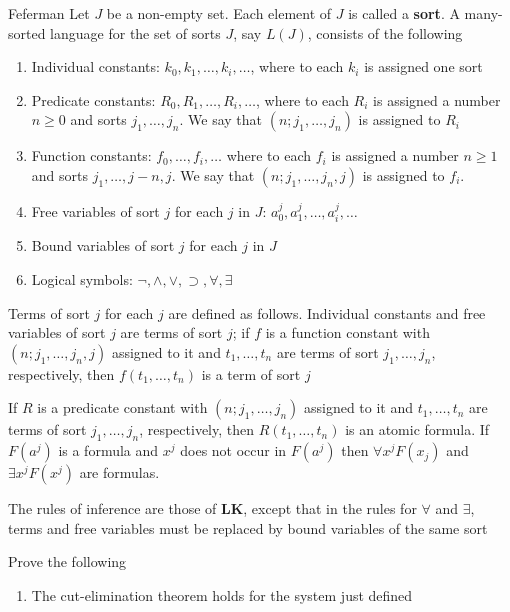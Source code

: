 \documentclass[11pt]{article}
\def \LK {\textbf{LK}}
\begin{document}
\begin{exercise}{Feferman}
\label{ex8.4} 
Let \(J\) be a non-empty set. Each element of \(J\) is called a \textbf{sort}. A many-sorted language for
the set of sorts \(J\), say \(L(J)\), consists of the following
\begin{enumerate}
\item Individual constants: \(k_0,k_1,\dots,k_i,\dots\), where to each \(k_i\) is assigned one sort
\item Predicate constants: \(R_0,R_1,\dots,R_i,\dots\), where to each \(R_i\) is assigned a number
\(n\ge0\) and sorts \(j_1,\dots,j_n\). We say that \((n;j_1,\dots,j_n)\) is assigned to \(R_i\)
\item Function constants: \(f_0,\dots,f_i,\dots\) where to each \(f_i\) is assigned a number
\(n\ge1\) and sorts \(j_1,\dots,j-n,j\). We say that \((n;j_1,\dots,j_n,j)\) is assigned to \(f_i\).
\item Free variables of sort \(j\) for each \(j\) in \(J\): \(a_0^j,a_1^j,\dots,a_i^j,\dots\)
\item Bound variables of sort \(j\) for each \(j\) in \(J\)
\item Logical symbols: \(\neg,\wedge,\vee,\supset,\forall, \exists\)
\end{enumerate}


Terms of sort \(j\) for each \(j\) are defined as follows. Individual constants and free
variables of sort \(j\) are terms of sort \(j\); if \(f\) is a function constant with
\((n;j_1,\dots,j_n,j)\) assigned to it and \(t_1,\dots,t_n\) are terms of sort \(j_1,\dots,j_n\),
respectively, then \(f(t_1,\dots,t_n)\) is a term of sort \(j\)

If \(R\) is a predicate constant with \((n;j_1,\dots,j_n)\) assigned to it and \(t_1,\dots,t_n\)
are terms of sort \(j_1,\dots,j_n\), respectively, then \(R(t_1,\dots,t_n)\) is an atomic
formula. If \(F(a^j)\) is a formula and \(x^j\) does not occur in \(F(a^j)\) then \(\forall x^jF(x_j)\)
and \(\exists x^jF(x^j)\) are formulas.

The rules of inference are those of \(\LK\), except that in the rules for \(\forall\) and
\(\exists\), terms and free variables must be replaced by bound variables of the same sort

Prove the following
\begin{enumerate}
\item The cut-elimination theorem holds for the system just defined
\end{enumerate}


\end{exercise}
\end{document}
